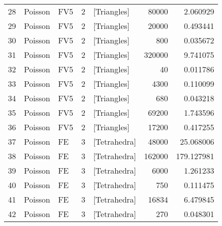 \begin{tabular}{lllrlrr}
28 &   Poisson &                   FV5 &               2 &    [Triangles] &                    80000 &                         2.060929 \\
29 &   Poisson &                   FV5 &               2 &    [Triangles] &                    20000 &                         0.493441 \\
30 &   Poisson &                   FV5 &               2 &    [Triangles] &                      800 &                         0.035672 \\
31 &   Poisson &                   FV5 &               2 &    [Triangles] &                   320000 &                         9.741075 \\
32 &   Poisson &                   FV5 &               2 &    [Triangles] &                       40 &                         0.011786 \\
33 &   Poisson &                   FV5 &               2 &    [Triangles] &                     4300 &                         0.110099 \\
34 &   Poisson &                   FV5 &               2 &    [Triangles] &                      680 &                         0.043218 \\
35 &   Poisson &                   FV5 &               2 &    [Triangles] &                    69200 &                         1.743596 \\
36 &   Poisson &                   FV5 &               2 &    [Triangles] &                    17200 &                         0.417255 \\
37 &   Poisson &                    FE &               3 &   [Tetrahedra] &                    48000 &                        25.068006 \\
38 &   Poisson &                    FE &               3 &   [Tetrahedra] &                   162000 &                       179.127981 \\
39 &   Poisson &                    FE &               3 &   [Tetrahedra] &                     6000 &                         1.261233 \\
40 &   Poisson &                    FE &               3 &   [Tetrahedra] &                      750 &                         0.111475 \\
41 &   Poisson &                    FE &               3 &   [Tetrahedra] &                    16834 &                         6.479845 \\
42 &   Poisson &                    FE &               3 &   [Tetrahedra] &                      270 &                         0.048301 \\

\end{tabular}
